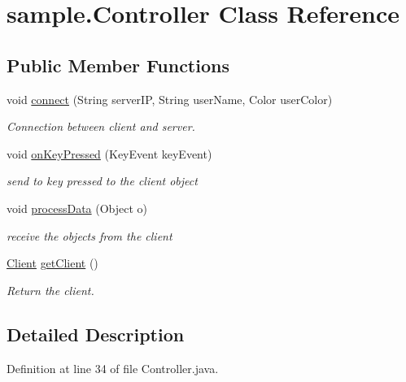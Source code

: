 \hypertarget{classsample_1_1_controller}{}\section{sample.\+Controller Class Reference}
\label{classsample_1_1_controller}
\subsection*{Public Member Functions}
\begin{DoxyCompactItemize}
\item 
void \hyperlink{classsample_1_1_controller_a65dad2fa17f9b15a2960c821fe35c7c9}{connect} (String server\+IP, String user\+Name, Color user\+Color)
\begin{DoxyCompactList}\small\item\em Connection between client and server. \end{DoxyCompactList}\item 
void \hyperlink{classsample_1_1_controller_a31ef16ada5fa90e7216d0c9b4e78fbd2}{on\+Key\+Pressed} (Key\+Event key\+Event)
\begin{DoxyCompactList}\small\item\em send to key pressed to the client object \end{DoxyCompactList}\item 
void \hyperlink{classsample_1_1_controller_a4e96857dfe66c3e7fcb60deaeca5d5c9}{process\+Data} (Object o)
\begin{DoxyCompactList}\small\item\em receive the objects from the client \end{DoxyCompactList}\item 
\hyperlink{classclient_1_1_client}{Client} \hyperlink{classsample_1_1_controller_adcbbb3b9c5b3a037b3c61560ba0f5c62}{get\+Client} ()
\begin{DoxyCompactList}\small\item\em Return the client. \end{DoxyCompactList}\end{DoxyCompactItemize}


\subsection{Detailed Description}


Definition at line 34 of file Controller.\+java.



